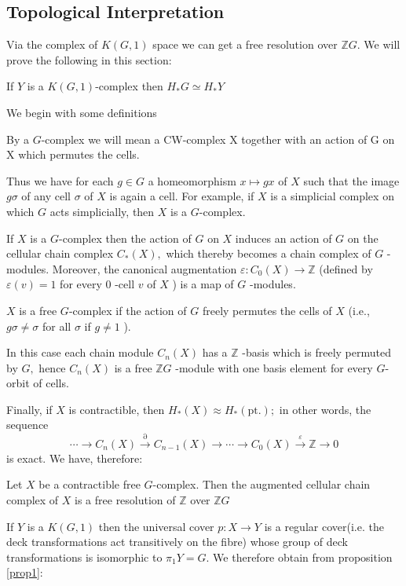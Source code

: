 \subsection{Topological Interpretation}
Via the complex of $K(G,1)$ space we can get a free resolution over $\mathbb{Z}G$. We will prove the following in this section:
\begin{theorem}
\label{thm1}
If $Y$ is a $K(G,1)$-complex then $H_\ast G\simeq H_\ast Y $
\end{theorem}
We begin with some definitions
\begin{definition}
By a $G$-complex we will mean a CW-complex X together with an action of G on X which permutes the cells.
\end{definition}
Thus we have for each $g \in G$ a homeomorphism $x \mapsto g x$ of $X$ such that the image $g \sigma$ of any cell $\sigma$ of $X$ is again a cell. For example, if $X$ is a simplicial complex on which $G$ acts simplicially, then $X$ is a $G$-complex.
\par
If $X$ is a $G$-complex then the action of $G$ on $X$ induces an action of $G$ on the cellular chain complex $C_{*}(X),$ which thereby becomes a chain complex of $G$ -modules. Moreover, the canonical augmentation $\varepsilon: C_{0}(X) \rightarrow \mathbb{Z}$ (defined by $\varepsilon(v)=1$ for every 0 -cell $v$ of $X$ ) is a map of $G$ -modules.
\par
\begin{definition}
$X$ is a free $G$-complex if the action of $G$ freely permutes the cells of $X$ (i.e., $g \sigma \neq \sigma$ for all $\sigma$ if $g \neq 1$ ). 
\end{definition}
In this case each chain module $C_{n}(X)$ has a $\mathbb{Z}$ -basis which is freely permuted by $G,$ hence $ C_{n}(X)$ is a free $\mathbb{Z} G$ -module with one basis element for every $G$-orbit of cells. 
\par
Finally, if $X$ is contractible, then $H_{*}(X) \approx H_{*}(\mathrm{pt} .) ;$ in other words, the sequence
\[
\cdots \rightarrow C_{n}(X) \stackrel{\partial}{\rightarrow} C_{n-1}(X) \rightarrow \cdots \rightarrow C_{0}(X) \stackrel{\varepsilon}{\rightarrow} \mathbb{Z} \rightarrow 0
\]
is exact. We have, therefore:
\begin{proposition}
\label{prop1}
Let $X$ be a contractible free $G$-complex. Then the augmented cellular chain complex of $X$ is a free resolution of $\mathbb{Z}$ over $\mathbb{Z} G$
\end{proposition}
If $Y$ is a $K(G, 1)$ then the universal cover $p: X \rightarrow Y$ is a regular cover(i.e. the deck transformations act transitively on the fibre) whose group of deck transformations is isomorphic to $\pi_{1} Y=G$.  We therefore obtain from proposition \ref{prop1}:
